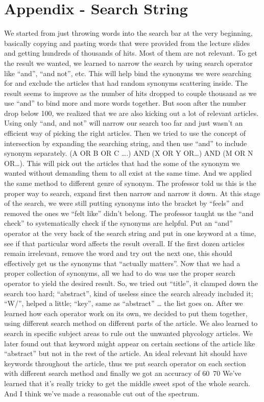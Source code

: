 \documentclass[
10pt, %
a4paper, %
oneside, %
headinclude,footinclude, %
BCOR5mm, %
]{scrartcl}
\begin{document}
\section{Appendix - Search String} \label{appendix:search_strings}
We started from just throwing words into the search bar at the very beginning, basically copying and pasting words that were provided from the lecture slides and getting hundreds of thousands of hits. Most of them are not relevant. To get the result we wanted, we learned to narrow the search by using search operator like “and”, “and not”, etc. This will help bind the synonyms we were searching for and exclude the articles that had random synonyms scattering inside.
    The result seems to improve as the number of hits dropped to couple thousand as we use “and” to bind more and more words together. But soon after the number drop below 100, we realized that we are also kicking out a lot of relevant articles. Using only “and, and not” will narrow our search too far and just wasn’t an efficient way of picking the right articles.
    Then we tried to use the concept of intersection by expanding the searching string, and then use “and” to include synonym separately. (A OR B OR C ….) AND (X OR Y OR…) AND (M OR N OR…). This will pick out the articles that had the some of the synonym we wanted without demanding them to all exist at the same time. And we applied the same method to different genre of synonym.
The professor told us this is the proper way to search, expand first then narrow and narrow it down.
    At this stage of the search, we were still putting synonyms into the bracket by “feels” and removed the ones we “felt like” didn’t belong. The professor taught us the “and check” to systematically check if the synonyms are helpful. Put an “and” operator at the very back of the search string and put in one keyword at a time, see if that particular word affects the result overall. If the first dozen articles remain irrelevant, remove the word and try out the next one, this should effectively get us the synonyms that “actually matters”. 
    Now that we had a proper collection of synonyms, all we had to do was use the proper search operator to yield the desired result. So, we tried out “title”, it clamped down the search too hard; “abstract”, kind of useless since the search already included it; “W/”, helped a little; “key”, same as “abstract” … the list goes on. 
    After we learned how each operator work on its own, we decided to put them together, using different search method on different parts of the article. We also learned to search in specific subject areas to rule out the unwanted phycology articles.
    We later found out that keyword might appear on certain sections of the article like “abstract” but not in the rest of the article. An ideal relevant hit should have keywords throughout the article, thus we put search operator on each section with different search method and finally we got an accuracy of 60~70%
    We’ve learned that it’s really tricky to get the middle sweet spot of the whole search. And I think we’ve made a reasonable cut out of the spectrum.
\end{document}
